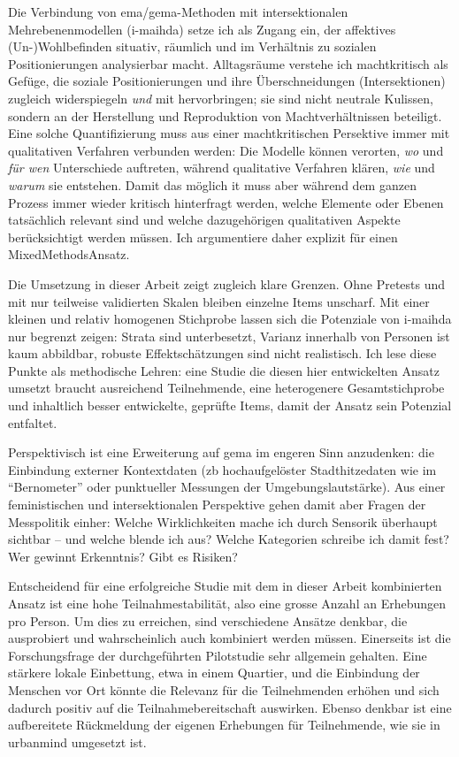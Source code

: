 Die Verbindung von \gls{ema}/\gls{gema}-Methoden mit intersektionalen Mehrebenenmodellen (\gls{i-maihda}) setze ich als Zugang ein, der affektives (Un-)Wohlbefinden situativ, räumlich und im Verhältnis zu sozialen Positionierungen analysierbar macht. Alltagsräume verstehe ich machtkritisch als Gefüge, die soziale Positionierungen und ihre Überschneidungen (Intersektionen) zugleich widerspiegeln \emph{und} mit hervorbringen; sie sind nicht neutrale Kulissen, sondern an der Herstellung und Reproduktion von Machtverhältnissen beteiligt. 
Eine solche Quantifizierung muss aus einer machtkritischen Persektive immer mit qualitativen Verfahren verbunden werden: Die Modelle können verorten, \emph{wo} und \emph{für wen} Unterschiede auftreten, während qualitative Verfahren klären, \emph{wie} und \emph{warum} sie entstehen. Damit das möglich it muss aber während dem ganzen Prozess immer wieder kritisch hinterfragt werden, welche Elemente oder Ebenen tatsächlich relevant sind und welche dazugehörigen qualitativen Aspekte berücksichtigt werden müssen. Ich argumentiere daher explizit für einen Mixed\-Methods\-Ansatz.

Die Umsetzung in dieser Arbeit zeigt zugleich klare Grenzen. Ohne Pretests und mit nur teilweise validierten Skalen bleiben einzelne Items unscharf. Mit einer kleinen und relativ homogenen Stichprobe lassen sich die Potenziale von \gls{i-maihda} nur begrenzt zeigen: Strata sind unterbesetzt, Varianz innerhalb von Personen ist kaum abbildbar, robuste Effektschätzungen sind nicht realistisch. Ich lese diese Punkte als methodische Lehren: eine Studie die diesen hier entwickelten Ansatz umsetzt braucht ausreichend Teilnehmende, eine heterogenere Gesamtstichprobe und inhaltlich besser entwickelte, geprüfte Items, damit der Ansatz sein Potenzial entfaltet.

Perspektivisch ist eine Erweiterung auf \gls{gema} im engeren Sinn anzudenken: die Einbindung externer Kontextdaten (\gls{zb} hochaufgelöster Stadthitzedaten wie im \enquote{Bernometer} \parencite[siehe][]{burgerModellingSpatialPattern2021} oder punktueller Messungen der Umgebungslautstärke). Aus einer feministischen und intersektionalen Perspektive gehen damit aber Fragen der Messpolitik einher: Welche Wirklichkeiten mache ich durch Sensorik überhaupt sichtbar -- und welche blende ich aus? Welche Kategorien schreibe ich damit fest? Wer gewinnt Erkenntnis? Gibt es Risiken?

Entscheidend für eine erfolgreiche Studie mit dem in dieser Arbeit kombinierten Ansatz ist eine hohe Teilnahmestabilität, also eine grosse Anzahl an Erhebungen pro Person. Um dies zu erreichen, sind verschiedene Ansätze denkbar, die ausprobiert und wahrscheinlich auch kombiniert werden müssen. Einerseits ist die Forschungsfrage der durchgeführten Pilotstudie sehr allgemein gehalten. Eine stärkere lokale Einbettung, etwa in einem Quartier, und die Einbindung der Menschen vor Ort könnte die Relevanz für die Teilnehmenden erhöhen und sich dadurch positiv auf die Teilnahmebereitschaft auswirken. Ebenso denkbar ist eine aufbereitete Rückmeldung der eigenen Erhebungen für Teilnehmende, wie sie in \gls{urbanmind} umgesetzt ist.

